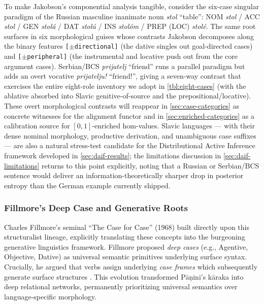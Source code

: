\documentclass[
]{article}
\begin{document}
To make Jakobson's componential analysis tangible, consider the six-case
singular paradigm of the Russian masculine inanimate noun \emph{stol}
``table'': NOM \emph{stol} / ACC \emph{stol} / GEN \emph{stolá} / DAT
\emph{stolú} / INS \emph{stolóm} / PREP (LOC) \emph{stolé}. The same
root surfaces in six morphological guises whose contrasts Jakobson
decomposes along the binary features \texttt{{[}\texorpdfstring{\ensuremath{\pm}}{+/-}directional{]}} (the
dative singles out goal-directed cases) and \texttt{{[}\texorpdfstring{\ensuremath{\pm}}{+/-}peripheral{]}}
(the instrumental and locative push out from the core argument cases).
Serbian/BCS \emph{prijatelj} ``friend'' runs a parallel paradigm but
adds an overt vocative \emph{prijatelju!} ``friend!'', giving a
seven-way contrast that exercises the entire eight-role inventory we
adopt in \autoref{tbl:eight-cases} (with the ablative absorbed into
Slavic genitive-of-source and the prepositional/locative). These overt
morphological contrasts will reappear in \autoref{sec:case-categories}
as concrete witnesses for the alignment functor and in
\autoref{sec:enriched-categories} as a calibration source for
\([0,1]\)-enriched hom-values. Slavic languages --- with their dense
nominal morphology, productive derivation, and unambiguous case suffixes
--- are also a natural stress-test candidate for the Distributional
Active Inference framework developed in \autoref{sec:daif-results}; the
limitations discussion in \autoref{sec:daif-limitations} returns to this
point explicitly, noting that a Russian or Serbian/BCS sentence would
deliver an information-theoretically sharper drop in posterior entropy
than the German example currently shipped.

\subsubsection{Fillmore's Deep Case and Generative
Roots}\label{fillmores-deep-case-and-generative-roots}

Charles Fillmore's seminal ``The Case for Case'' (1968) built directly
upon this structuralist lineage, explicitly translating these concepts
into the burgeoning generative linguistics framework. Fillmore proposed
\emph{deep cases} (e.g., Agentive, Objective, Dative) as universal
semantic primitives underlying surface syntax. Crucially, he argued that
verbs assign underlying \emph{case frames} which subsequently generate
surface structures \citeyearpar{fillmore1968case}. This evolution
transformed Pāṇini's kāraka into deep relational networks, permanently
prioritizing universal semantics over language-specific morphology.
\end{document}
